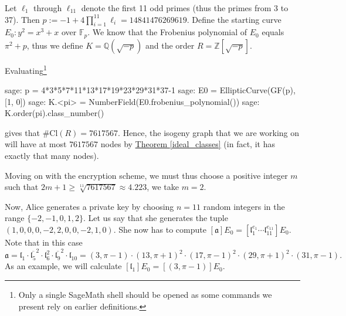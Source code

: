 \documentclass[openany, a4paper, 10pt]{book}
\theoremstyle{plain}
\theoremstyle{plain}
\theoremstyle{plain}
\theoremstyle{definition}
\theoremstyle{plain}
\theoremstyle{definition}
\theoremstyle{remark}
\newcommand{\theoref}[1]{\hyperref[#1]{Theorem \ref{#1}}}
\begin{document}
\begin{examplebox}
    Let $\ell_1$ through $\ell_{11}$ denote the first 11 odd primes (thus the primes from 3 to 37).
    Then $p := -1 + 4\prod_{i=1}^{11} \ell_i = 14841476269619$.
    Define the starting curve $E_0: y^2 = x^3+x$ over $\mathbb F_p$.
    We know that the Frobenius polynomial of $E_0$ equals $\pi^2 + p$, thus we define $K = \mathbb Q(\sqrt{-p})$ and the order $R = \mathbb Z[\sqrt{-p}]$.

    Evaluating\footnote{Only a single SageMath shell should be opened as some commands we present rely on earlier definitions.}
    \begin{python}
sage: p = 4*3*5*7*11*13*17*19*23*29*31*37-1
sage: E0 = EllipticCurve(GF(p), [1, 0])
sage: K.<pi> = NumberField(E0.frobenius_polynomial())
sage: K.order(pi).class_number()
    \end{python}
    gives that $\#\mathrm{Cl}(R) = 7617567$.
    Hence, the isogeny graph that we are working on will have at most $7617567$ nodes by \theoref{ideal_classes} (in fact, it has exactly that many nodes).

    Moving on with the encryption scheme,
    we must thus choose a positive integer $m$ such that $2m+1 \geq \sqrt[11]{7617567} \approx 4.223$, we take $m=2$.

    Now, Alice generates a private key by choosing $n=11$ random integers in the range $\{-2, -1, 0, 1, 2\}$.
    Let us say that she generates the tuple $(1,0,0,0,-2,2,0,0,-2,1,0)$.
    She now has to compute $[\mathfrak a]E_0 = [\mathfrak l_1^{e_1} \cdots \mathfrak l_{11}^{e_{11}}]E_0$.
    Note that in this case
    \begin{equation*}
        \mathfrak a = \mathfrak l_1 \cdot \overline{\mathfrak l_5}^2 \cdot \mathfrak l_6^2 \cdot \overline{\mathfrak l_9}^2 \cdot \mathfrak l_{10} = (3, \pi-1)\cdot (13, \pi+1)^2 \cdot (17, \pi-1)^2 \cdot (29, \pi+1)^2 \cdot (31, \pi-1).
    \end{equation*}
    As an example, we will calculate $[\mathfrak l_1]E_0 = [(3, \pi-1)]E_0$.


\end{examplebox}
\end{document}
